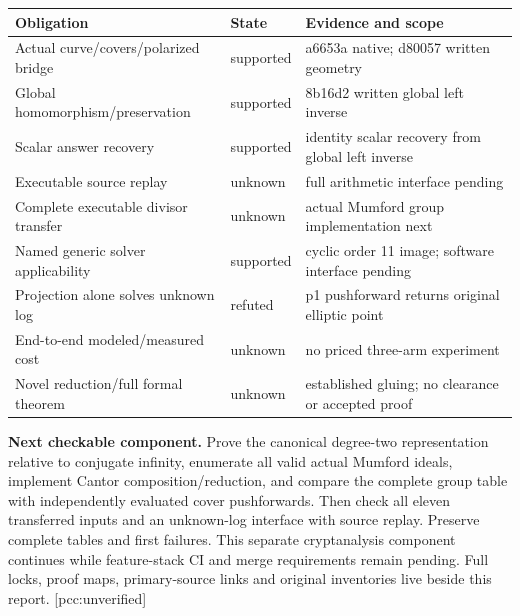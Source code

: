 \documentclass[10pt,a4paper]{article}
\begin{document}
\begin{center}\small
\begin{tabular}{p{57mm}p{24mm}p{71mm}}
\toprule
Obligation & State & Evidence and scope\\
\midrule
Actual curve/covers/polarized bridge & supported & a6653a native; d80057 written geometry\\
Global homomorphism/preservation & supported & 8b16d2 written global left inverse\\
Scalar answer recovery & supported & identity scalar recovery from global left inverse\\
Executable source replay & unknown & full arithmetic interface pending\\
Complete executable divisor transfer & unknown & actual Mumford group implementation next\\
Named generic solver applicability & supported & cyclic order 11 image; software interface pending\\
Projection alone solves unknown log & refuted & p1 pushforward returns original elliptic point\\
End-to-end modeled/measured cost & unknown & no priced three-arm experiment\\
Novel reduction/full formal theorem & unknown & established gluing; no clearance or accepted proof\\
\bottomrule
\end{tabular}\end{center}

\textbf{Next checkable component.} Prove the canonical degree-two
representation relative to conjugate infinity, enumerate all valid actual
Mumford ideals, implement Cantor composition/reduction, and compare the
complete group table with independently evaluated cover pushforwards.
Then check all eleven transferred inputs and an unknown-log interface
with source replay. Preserve complete tables and first failures. This
separate cryptanalysis component continues while feature-stack CI and
merge requirements remain pending. Full locks, proof maps, primary-source
links and original inventories live beside this report. [pcc:unverified]
\end{document}
